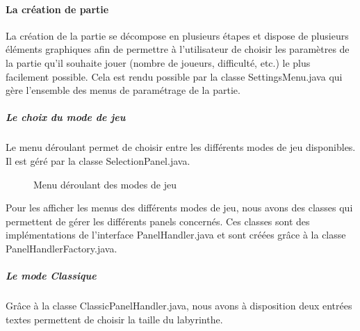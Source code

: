 \paragraph{La création de partie}

La création de la partie se décompose en plusieurs étapes et dispose de plusieurs éléments graphiques afin de permettre à l'utilisateur de choisir les paramètres de la partie qu'il souhaite jouer (nombre de joueurs, difficulté, etc.) le plus facilement possible. Cela est rendu possible par la classe SettingsMenu.java qui gère l'ensemble des menus de paramétrage de la partie.

\subparagraph*{Le choix du mode de jeu}

Le menu déroulant permet de choisir entre les différents modes de jeu disponibles. Il est géré par la classe SelectionPanel.java.

\begin{figure}[h!]
    \centering
    \caption{Menu déroulant des modes de jeu}
    \label{fig:ModeSelection}
\end{figure}
\FloatBarrier

Pour les afficher les menus des différents modes de jeu, nous avons des classes qui permettent de gérer les différents panels concernés. Ces classes sont des implémentations de l'interface PanelHandler.java et sont créées grâce à la classe PanelHandlerFactory.java.

\subparagraph*{Le mode Classique}

Grâce à la classe ClassicPanelHandler.java, nous avons à disposition deux entrées textes permettent de choisir la taille du labyrinthe.

